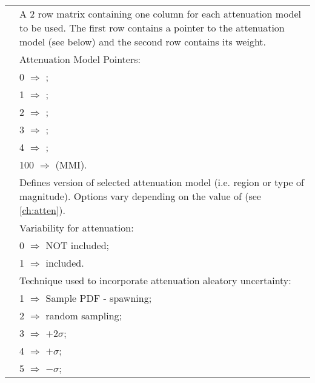 \begin{supertabular}{lp{0.6\textwidth}}
    &  A 2 row matrix containing one column for each attenuation model to be used.
The first row contains a pointer to the attenuation model (see below) and the second row contains its weight. \\
&  Attenuation Model Pointers: \\
 & \hspace{0.5em} 0 $\Rightarrow$ \cite{dr_Gaull90a}; \\
 & \hspace{0.5em} 1 $\Rightarrow$ \cite{dr_Toro97a}; \\
 & \hspace{0.5em} 2 $\Rightarrow$ \cite{dr_Atkinson97a}; \\
 & \hspace{0.5em} 3 $\Rightarrow$ \cite{dr_Sadigh97a}; \\
 & \hspace{0.5em} 4 $\Rightarrow$ \cite{dr_Somerville01a}; \\
 & \hspace{0.5em} 100 $\Rightarrow$ \cite{dr_Gaull90a} (MMI). \\
    &   Defines version of selected
attenuation model (i.e. region or type
 of magnitude). Options vary depending on the value of  (see \cref{ch:atten}).  \\
   &  Variability for attenuation: \\
 & \hspace{0.5em} 0 $\Rightarrow$ NOT included; \\
  & \hspace{0.5em}  1 $\Rightarrow$ included.   \\
 & Technique used to
incorporate attenuation aleatory uncertainty: \\
 & \hspace{0.5em} 1 $\Rightarrow$ Sample PDF - spawning; \\
 & \hspace{0.5em} 2 $\Rightarrow$ random sampling; \\
 & \hspace{0.5em} 3 $\Rightarrow$ $+2\sigma$; \\
 & \hspace{0.5em} 4 $\Rightarrow$ $+\sigma$; \\
 & \hspace{0.5em} 5 $\Rightarrow$ $-\sigma$; \\

\end{supertabular}
